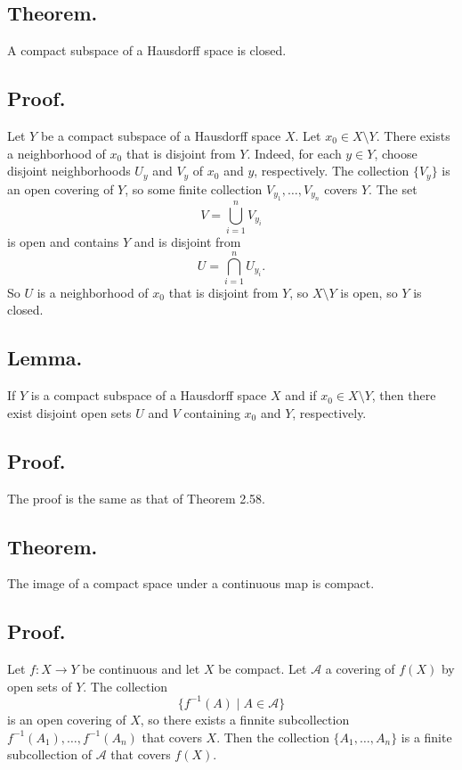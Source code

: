 \documentclass[titlepage]{article}
\begin{document}
\subsection{Theorem.} A compact subspace of a Hausdorff space is closed.

\subsection{Proof.} Let $Y$ be a compact subspace of a Hausdorff space $X$. Let $x_{0} \in X \setminus Y$. There exists a neighborhood of $x_{0}$ that is disjoint from $Y$. Indeed, for each $y \in Y$, choose disjoint neighborhoods $U_{y}$ and $V_{y}$ of $x_{0}$ and $y$, respectively. The collection $\{V_{y}\}$ is an open covering of $Y$, so some finite collection $V_{y_{1}}, \ldots, V_{y_{n}}$ covers $Y$. The set 
$$V = \bigcup_{i=1}^{n} V_{y_{i}}$$
is open and contains $Y$ and is disjoint from 
$$U = \bigcap_{i=1}^{n} U_{y_{i}}.$$
So $U$ is a neighborhood of $x_{0}$ that is disjoint from $Y$, so $X \setminus Y$ is open, so $Y$ is closed.

\subsection{Lemma.} If $Y$ is a compact subspace of a Hausdorff space $X$ and if $x_{0} \in X \setminus Y$, then there exist disjoint open sets $U$ and $V$ containing $x_{0}$ and $Y$, respectively.

\subsection{Proof.} The proof is the same as that of Theorem 2.58.

\subsection{Theorem.} The image of a compact space under a continuous map is compact.

\subsection{Proof.} Let $f: X \to Y$ be continuous and let $X$ be compact. Let $\mathcal{A}$ a covering of $f(X)$ by open sets of $Y$. The collection 
$$\{f^{-1}(A) \mid A \in \mathcal{A}\}$$
is an open covering of $X$, so there exists a finnite subcollection $f^{-1}(A_{1}), \ldots, f^{-1}(A_{n})$ that covers $X$. Then the collection $\{A_{1}, \ldots, A_{n}\}$ is a finite subcollection of $\mathcal{A}$ that covers $f(X)$.
\end{document}
